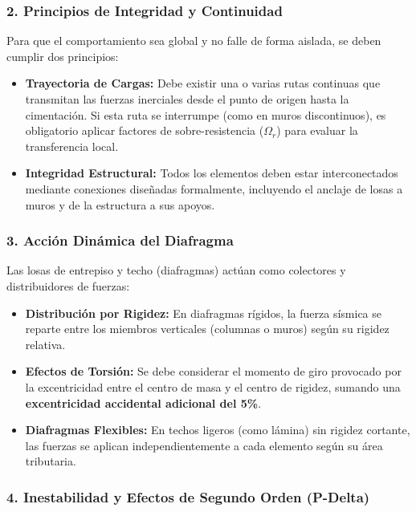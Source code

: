 \documentclass[14pt,letterpaper]{extarticle}
\begin{document}
	\subsubsection{2. Principios de Integridad y Continuidad}
	
	Para que el comportamiento sea global y no falle de forma aislada, se deben cumplir dos principios:
	
	\begin{itemize}
		\item \textbf{Trayectoria de Cargas:} Debe existir una o varias rutas continuas que transmitan las fuerzas inerciales desde el punto de origen hasta la cimentación. Si esta ruta se interrumpe (como en muros discontinuos), es obligatorio aplicar factores de sobre-resistencia ($\Omega_r$) para evaluar la transferencia local.
		
		\item \textbf{Integridad Estructural:} Todos los elementos deben estar interconectados mediante conexiones diseñadas formalmente, incluyendo el anclaje de losas a muros y de la estructura a sus apoyos.
	\end{itemize}
	
	\subsubsection{3. Acción Dinámica del Diafragma}
	
	Las losas de entrepiso y techo (diafragmas) actúan como colectores y distribuidores de fuerzas:
	
	\begin{itemize}
		\item \textbf{Distribución por Rigidez:} En diafragmas rígidos, la fuerza sísmica se reparte entre los miembros verticales (columnas o muros) según su rigidez relativa.
		
		\item \textbf{Efectos de Torsión:} Se debe considerar el momento de giro provocado por la excentricidad entre el centro de masa y el centro de rigidez, sumando una \textbf{excentricidad accidental adicional del 5\%}.
		
		\item \textbf{Diafragmas Flexibles:} En techos ligeros (como lámina) sin rigidez cortante, las fuerzas se aplican independientemente a cada elemento según su área tributaria.
	\end{itemize}
	
	\subsubsection{4. Inestabilidad y Efectos de Segundo Orden (P-Delta)}
	
\end{document}

